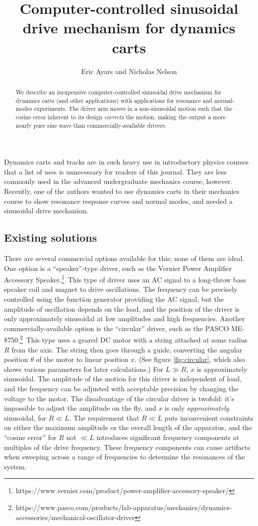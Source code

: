 \documentclass[11 pt]{article}
\title{Computer-controlled sinusoidal drive mechanism for dynamics carts}
\author{Eric Ayars and Nicholas Nelson}
\begin{document}
\maketitle

\begin{abstract}
We describe an inexpensive computer-controlled sinusoidal drive mechanism for dynamics carts (and other applications) with applications for resonance and normal-modes experiments.
The driver arm moves in a non-sinusoidal motion such that the cosine error inherent to its design \emph{corrects} the motion, making the output a more nearly pure sine wave than commercially-available drivers.
\end{abstract}

Dynamics carts and tracks are in such heavy use in introductory physics courses that a list of uses is unnecessary for readers of this journal.
They are less commonly used in the advanced undergraduate mechanics course, however.
Recently, one of the authors wanted to use dynamics carts in their mechanics course to show resonance response curves and normal modes, and needed a sinusoidal drive mechanism.

\subsection*{Existing solutions}
There are several commercial options available for this; none of them are ideal. 
One option is a ``speaker''-type driver, such as the Vernier Power Amplifier Accessory Speaker.\footnote{https://www.vernier.com/product/power-amplifier-accessory-speaker/}\  
This type of driver uses an AC signal to a long-throw bass speaker coil and magnet to drive oscillations. 
The frequency can be precisely controlled using the function generator providing the AC signal, but the amplitude of oscillation depends on the load, and the position of the driver is only approximately sinusoidal at low amplitudes and high frequencies.
Another commercially-available option is the ``circular'' driver, such as the PASCO ME-8750.\footnote{https://www.pasco.com/products/lab-apparatus/mechanics/dynamics-accessories/mechanical-oscillator-driver}\ 
This type uses a geared DC motor with a string attached at some radius $R$ from the axis. The string then goes through a guide, converting the angular position $\theta$ of the motor to linear position $x$. (See figure \ref{fig:circular}, which also shows various parameters for later calculations.) 
For $L\gg R$, $x$ is approximately sinusoidal. 
The amplitude of the motion for this driver is independent of load, and the frequency can be adjusted with acceptable precision by changing the voltage to the motor.
The disadvantage of the circular driver is twofold: it's impossible to adjust the amplitude on the fly, and $x$ is only \emph{approximately} sinusoidal, for $R \ll L$.
The requirement that $R \ll L$ puts inconvenient constraints on either the maximum amplitude or the overall length of the apparatus, and the ``cosine error'' for $R$ not $\ll L$ introduces significant frequency components at multiples of the drive frequency. 
These frequency components can cause artifacts when sweeping across a range of frequencies to determine the resonances of the system.
\end{document}
